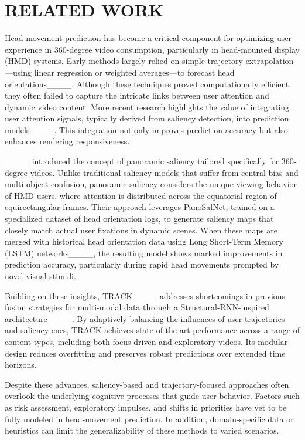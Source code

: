 \section{RELATED WORK}
Head movement prediction has become a critical component for optimizing user experience in 360-degree video consumption, particularly in head-mounted display (HMD) systems. 
Early methods largely relied on simple trajectory extrapolation—using linear regression or weighted averages—to forecast head orientations____.
Although these techniques proved computationally efficient, they often failed to capture the intricate links between user attention and dynamic video content. 
More recent research highlights the value of integrating user attention signals, typically derived from saliency detection, into prediction models____.
This integration not only improves prediction accuracy but also enhances rendering responsiveness.

____ introduced the concept of panoramic saliency tailored specifically for 360-degree videos. Unlike traditional saliency models that suffer from central bias and multi-object confusion, panoramic saliency considers the unique viewing behavior of HMD users, where attention is distributed across the equatorial region of equirectangular frames. 
Their approach leverages PanoSalNet, trained on a specialized dataset of head orientation logs, to generate saliency maps that closely match actual user fixations in dynamic scenes. 
When these maps are merged with historical head orientation data using Long Short-Term Memory (LSTM) networks____, the resulting model shows marked improvements in prediction accuracy, particularly during rapid head movements prompted by novel visual stimuli.

Building on these insights, TRACK____ addresses shortcomings in previous fusion strategies for multi-modal data through a Structural-RNN-inspired architecture____. 
By adaptively balancing the influences of user trajectories and saliency cues, TRACK achieves state-of-the-art performance across a range of content types, including both focus-driven and exploratory videos. Its modular design reduces overfitting and preserves robust predictions over extended time horizons.

Despite these advances, saliency-based and trajectory-focused approaches often overlook the underlying cognitive processes that guide user behavior. Factors such as risk assessment, exploratory impulses, and shifts in priorities have yet to be fully modeled in head-movement prediction. In addition, domain-specific data or heuristics can limit the generalizability of these methods to varied scenarios.

